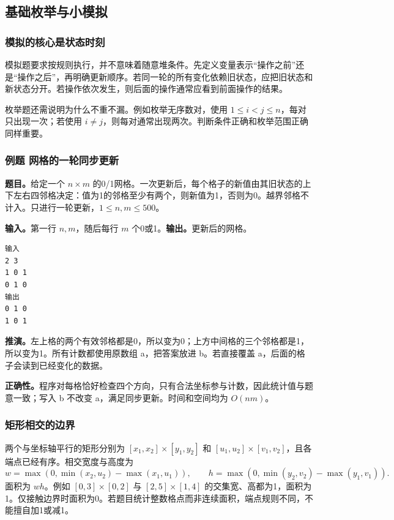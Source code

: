 \subsection{基础枚举与小模拟}
\subsubsection{模拟的核心是状态时刻}
模拟题要求按规则执行，并不意味着随意堆条件。先定义变量表示“操作之前”还是“操作之后”，再明确更新顺序。若同一轮的所有变化依赖旧状态，应把旧状态和新状态分开。若操作依次发生，则后面的操作通常应看到前面操作的结果。

枚举题还需说明为什么不重不漏。例如枚举无序数对，使用 $1\le i<j\le n$，每对只出现一次；若使用 $i\ne j$，则每对通常出现两次。判断条件正确和枚举范围正确同样重要。

\subsubsection{例题 网格的一轮同步更新}
\textbf{题目。}给定一个 $n\times m$ 的0/1网格。一次更新后，每个格子的新值由其旧状态的上下左右四邻格决定：值为1的邻格至少有两个，则新值为1，否则为0。越界邻格不计入。只进行一轮更新，$1\le n,m\le500$。

\textbf{输入。}第一行 $n,m$，随后每行 $m$ 个0或1。\textbf{输出。}更新后的网格。
\begin{verbatim}
输入
2 3
1 0 1
0 1 0
输出
0 1 0
1 0 1
\end{verbatim}
\textbf{推演。}左上格的两个有效邻格都是0，所以变为0；上方中间格的三个邻格都是1，所以变为1。所有计数都使用原数组 a，把答案放进 b。若直接覆盖 a，后面的格子会读到已经变化的数据。

\textbf{正确性。}程序对每格恰好检查四个方向，只有合法坐标参与计数，因此统计值与题意一致；写入 b 不改变 a，满足同步更新。时间和空间均为 $O(nm)$。

\subsubsection{矩形相交的边界}
两个与坐标轴平行的矩形分别为 $[x_1,x_2]\times[y_1,y_2]$ 和 $[u_1,u_2]\times[v_1,v_2]$，且各端点已经有序。相交宽度与高度为
\[
w=\max(0,\min(x_2,u_2)-\max(x_1,u_1)),\qquad
h=\max(0,\min(y_2,v_2)-\max(y_1,v_1)).
\]
面积为 $wh$。例如 $[0,3]\times[0,2]$ 与 $[2,5]\times[1,4]$ 的交集宽、高都为1，面积为1。仅接触边界时面积为0。若题目统计整数格点而非连续面积，端点规则不同，不能擅自加1或减1。

